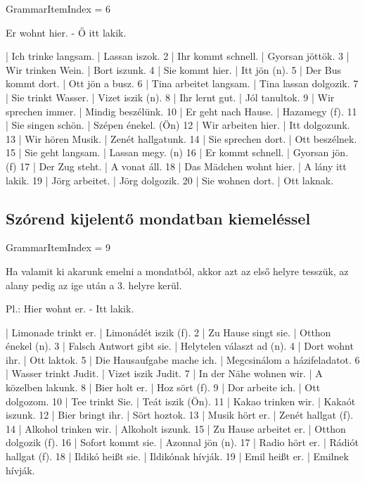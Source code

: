 \documentclass{article}
\newenvironment{desc}{\verbatim}{\endverbatim}
\newenvironment{exmp}{\verbatim}{\endverbatim}
\begin{document}
GrammarItemIndex = 6

\begin{desc}
Er wohnt hier. - Ő itt lakik.
\end{desc}

\begin{exmp}
1 | Ich trinke langsam. | Lassan iszok.
2 | Ihr kommt schnell. | Gyorsan jöttök.
3 | Wir trinken Wein. | Bort iszunk.
4 | Sie kommt hier. | Itt jön (n).
5 | Der Bus kommt dort. | Ott jön a busz.
6 | Tina arbeitet langsam. | Tina lassan dolgozik.
7 | Sie trinkt Wasser. | Vizet iszik (n).
8 | Ihr lernt gut. | Jól tanultok.
9 | Wir sprechen immer. | Mindig beszélünk.
10 | Er geht nach Hause. | Hazamegy (f).
11 | Sie singen schön. | Szépen énekel. (Ön)
12 | Wir arbeiten hier. | Itt dolgozunk.
13 | Wir hören Musik. | Zenét hallgatunk.
14 | Sie sprechen dort. | Ott beszélnek.
15 | Sie geht langsam. | Lassan megy. (n)
16 | Er kommt schnell. | Gyorsan jön. (f)
17 | Der Zug steht. | A vonat áll.
18 | Das Mädchen wohnt hier. | A lány itt lakik.
19 | Jörg arbeitet. | Jörg dolgozik.
20 | Sie wohnen dort. | Ott laknak.
\end{exmp}

\subsection{Szórend kijelentő mondatban kiemeléssel}

GrammarItemIndex = 9

\begin{desc}
Ha valamit ki akarunk emelni a mondatból, akkor azt az első helyre tesszük, az alany pedig az ige után a 3. helyre kerül.

Pl.: Hier wohnt er. - Itt lakik.
\end{desc}

\begin{exmp}
1 | Limonade trinkt er. | Limonádét iszik (f).
2 | Zu Hause singt sie. | Otthon énekel (n).
3 | Falsch Antwort gibt sie. | Helytelen választ ad (n).
4 | Dort wohnt ihr. | Ott laktok.
5 | Die Hausaufgabe mache ich. | Megcsinálom a házifeladatot.
6 | Wasser trinkt Judit. | Vizet iszik Judit.
7 | In der Nähe wohnen wir. | A közelben lakunk.
8 | Bier holt er. | Hoz sört (f).
9 | Dor arbeite ich. | Ott dolgozom.
10 | Tee trinkt Sie. | Teát iszik (Ön).
11 | Kakao trinken wir. | Kakaót iszunk.
12 | Bier bringt ihr. | Sört hoztok.
13 | Musik hört er. | Zenét hallgat (f).
14 | Alkohol trinken wir. | Alkoholt iszunk.
15 | Zu Hause arbeitet er. | Otthon dolgozik (f).
16 | Sofort kommt sie. | Azonnal jön (n).
17 | Radio hört er. | Rádiót hallgat (f).
18 | Ildikó heißt sie. | Ildikónak hívják.
19 | Emil heißt er. | Emilnek hívják.
\end{exmp}
\end{document}
